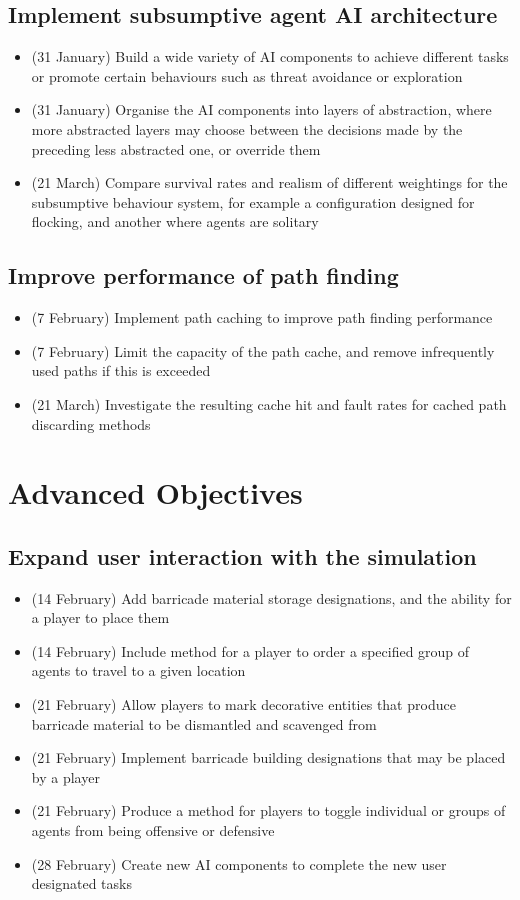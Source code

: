 \documentclass[a4paper,11pt]{article}
\begin{document}
\subsection{Implement subsumptive agent AI architecture}
    \begin{itemize}
    \item (31 January) Build a wide variety of AI components to achieve
        different tasks or promote certain behaviours such as threat avoidance
        or exploration
    \item (31 January) Organise the AI components into layers of abstraction,
        where more abstracted layers may choose between the decisions made by
        the preceding less abstracted one, or override them
    \item (21 March) Compare survival rates and realism of different weightings
        for the subsumptive behaviour system, for example a configuration
        designed for flocking, and another where agents are solitary
    \end{itemize}
\subsection{Improve performance of path finding}
    \begin{itemize}
    \item (7 February) Implement path caching to improve path finding
        performance
    \item (7 February) Limit the capacity of the path cache, and remove
        infrequently used paths if this is exceeded
    \item (21 March) Investigate the resulting cache hit and fault rates for
        cached path discarding methods
    \end{itemize}

\section{Advanced Objectives}
\subsection{Expand user interaction with the simulation}
    \begin{itemize}
    \item (14 February) Add barricade material storage designations, and the
        ability for a player to place them
    \item (14 February) Include method for a player to order a specified group
        of agents to travel to a given location
    \item (21 February) Allow players to mark decorative entities that produce
        barricade material to be dismantled and scavenged from
    \item (21 February) Implement barricade building designations that may be
        placed by a player
    \item (21 February) Produce a method for players to toggle individual or
        groups of agents from being offensive or defensive
    \item (28 February) Create new AI components to complete the new user
        designated tasks
    \end{itemize}
\end{document}
